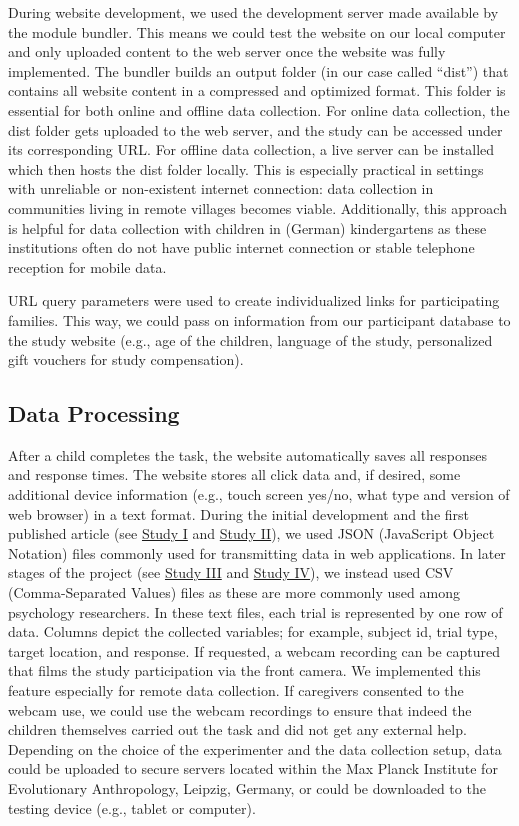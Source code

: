 \documentclass[
]{scrbook}
\begin{document}
During website development, we used the development server made available by the module bundler. This means we could test the website on our local computer and only uploaded content to the web server once the website was fully implemented. The bundler builds an output folder (in our case called ``dist'') that contains all website content in a compressed and optimized format. This folder is essential for both online and offline data collection. For online data collection, the dist folder gets uploaded to the web server, and the study can be accessed under its corresponding URL. For offline data collection, a live server can be installed which then hosts the dist folder locally. This is especially practical in settings with unreliable or non-existent internet connection: data collection in communities living in remote villages becomes viable. Additionally, this approach is helpful for data collection with children in (German) kindergartens as these institutions often do not have public internet connection or stable telephone reception for mobile data.

URL query parameters were used to create individualized links for participating families. This way, we could pass on information from our participant database to the study website (e.g., age of the children, language of the study, personalized gift vouchers for study compensation).

\subsection{Data Processing}\label{approach-dataprocessing}

After a child completes the task, the website automatically saves all responses and response times. The website stores all click data and, if desired, some additional device information (e.g., touch screen yes/no, what type and version of web browser) in a text format. During the initial development and the first published article (see \hyperref[studyI]{Study I} and \hyperref[studyII]{Study II}), we used JSON (JavaScript Object Notation) files commonly used for transmitting data in web applications. In later stages of the project (see \hyperref[studyIII]{Study III} and \hyperref[studyIV]{Study IV}), we instead used CSV (Comma-Separated Values) files as these are more commonly used among psychology researchers. In these text files, each trial is represented by one row of data. Columns depict the collected variables; for example, subject id, trial type, target location, and response. If requested, a webcam recording can be captured that films the study participation via the front camera. We implemented this feature especially for remote data collection. If caregivers consented to the webcam use, we could use the webcam recordings to ensure that indeed the children themselves carried out the task and did not get any external help. Depending on the choice of the experimenter and the data collection setup, data could be uploaded to secure servers located within the Max Planck Institute for Evolutionary Anthropology, Leipzig, Germany, or could be downloaded to the testing device (e.g., tablet or computer).
\end{document}
